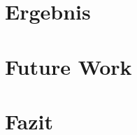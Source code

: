 \documentclass[12pt,a4paper]{report}
\begin{document}
\chapter{Ergebnis}
\chapter{Future Work}


\chapter{Fazit}

\printbibliography
\end{document}
